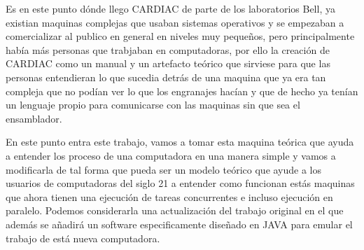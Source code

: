 \documentclass[12pt]{article}
\begin{document}
	
	Es en este punto dónde llego CARDIAC de parte de los laboratorios Bell, ya existian maquinas complejas que usaban sistemas operativos y se empezaban
	a comercializar al publico en general en niveles muy pequeños, pero principalmente había más personas que trabjaban en computadoras, por ello la creación
	de CARDIAC como un manual y un artefacto teórico que sirviese para que las personas entendieran lo que sucedia detrás de una maquina que ya era tan compleja
	que no podían ver lo que los engranajes hacían y que de hecho ya tenían un lenguaje propio para comunicarse con las maquinas sin que sea el ensamblador.
	
	En este punto entra este trabajo, vamos a tomar esta maquina teórica que ayuda a entender los proceso de una computadora en una manera simple y vamos
	a modificarla de tal forma que pueda ser un modelo teórico que ayude a los usuarios de computadoras del siglo 21 a entender como funcionan estás maquinas
	que ahora tienen una ejecución de tareas concurrentes e incluso ejecución en paralelo. Podemos considerarla una actualización del trabajo original en el que
	además se añadirá un software especificamente diseñado en JAVA para emular el trabajo de está nueva computadora.
	
\end{document}
